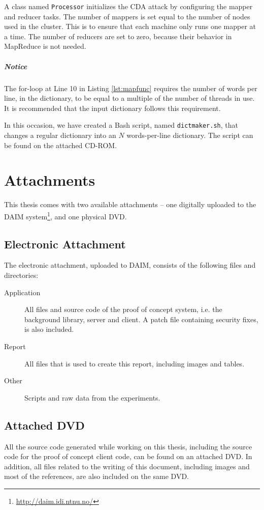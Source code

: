 \documentclass[pdftex,english,10pt,b5paper,twoside]{book}
\begin{document}
A class named \texttt{Processor} initializes the \ac{CDA} attack by configuring
the mapper and reducer tasks. The number of mappers is set equal to the number
of nodes used in the cluster. This is to ensure that each machine only runs one
mapper at a time. The number of reducers are set to zero, because their
behavior in MapReduce is not needed.

\paragraph{Notice} The for-loop at Line 10 in Listing \ref{lst:mapfunc}
requires the number of words per line, in the dictionary, to be equal to a
multiple of the number of threads in use. It is recommended that the input
dictionary follows this requirement.

In this occasion, we have created a Bash script, named \texttt{dictmaker.sh},
that changes a regular dictionary into an $N$ words-per-line dictionary. The
script can be found on the attached CD-ROM.

\chapter{Attachments}
\label{ap:attachments}

This thesis comes with two available attachments -- one digitally uploaded to
the DAIM system\footnote{\url{http://daim.idi.ntnu.no/}}, and one physical DVD.

\section{Electronic Attachment}

The electronic attachment, uploaded to
DAIM, consists of the following files
and directories:

\begin{description}
  \item[Application] All files and source code of the proof of concept system,
    i.e. the background library, server and client. A patch file containing
    security fixes, is also included.
  \item[Report] All files that is used to create this report, including images
    and tables.
  \item[Other] Scripts and raw data from the experiments.
\end{description}

\section{Attached DVD}

All the source code generated while working on this thesis, including the
source code for the proof of concept client code, can be found on an attached
DVD. In addition, all files related to the writing of this document, including
images and most of the references, are also included on the same DVD.
\end{document}
